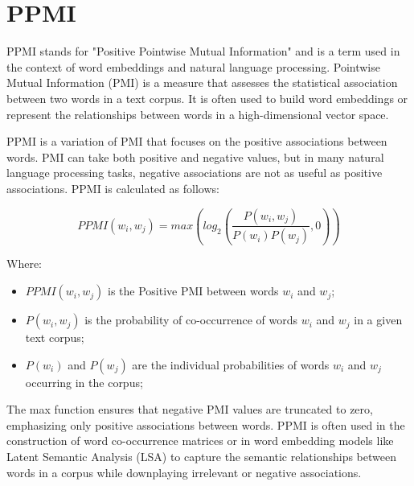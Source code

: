 \documentclass{article}
\begin{document}
\section{PPMI}

\begin{comment}
In implicit representations the number of dimensions of the representation is smaller, not readable. Once we decie how big the vector will be, it is a neural network that during the training process will create it, we have no control over it.
In explicit representations the number of dimensions of the representation is larger, normally given by the size of the vocabulary.
Explicit representation can be created either from words or senses.


ppMI(w, w') = log((P(w, w'))/(P(w)P(w'))) if P(w, w') > 0 else 0
\end{comment}

PPMI stands for "Positive Pointwise Mutual Information" and is a term used in the context of word embeddings and natural language processing. Pointwise Mutual Information (PMI) is a measure that assesses the statistical association between two words in a text corpus. It is often used to build word embeddings or represent the relationships between words in a high-dimensional vector space.

PPMI is a variation of PMI that focuses on the positive associations between words. PMI can take both positive and negative values, but in many natural language processing tasks, negative associations are not as useful as positive associations. PPMI is calculated as follows:

\begin{equation}
    PPMI(w_i, w_j) = max(log_2(\frac{P(w_i, w_j)}{P(w_i)P(w_j)}, 0))
\end{equation}

Where:
\begin{itemize}
    \item $PPMI(w_i, w_j)$ is the Positive PMI between words $w_i$ and $w_j$;
    \item $P(w_i, w_j)$ is the probability of co-occurrence of words $w_i$ and $w_j$ in a given text corpus;
    \item $P(w_i)$ and $P(w_j)$ are the individual probabilities of words $w_i$ and $w_j$ occurring in the corpus;
\end{itemize}

The max function ensures that negative PMI values are truncated to zero, emphasizing only positive associations between words. PPMI is often used in the construction of word co-occurrence matrices or in word embedding models like Latent Semantic Analysis (LSA) to capture the semantic relationships between words in a corpus while downplaying irrelevant or negative associations.
\end{document}
